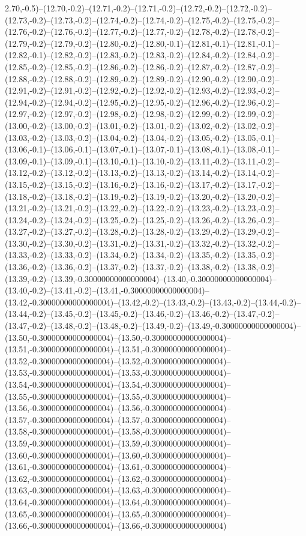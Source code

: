 2.70,-0.5)--(12.70,-0.2)--(12.71,-0.2)--(12.71,-0.2)--(12.72,-0.2)--(12.72,-0.2)--(12.73,-0.2)--(12.73,-0.2)--(12.74,-0.2)--(12.74,-0.2)--(12.75,-0.2)--(12.75,-0.2)--(12.76,-0.2)--(12.76,-0.2)--(12.77,-0.2)--(12.77,-0.2)--(12.78,-0.2)--(12.78,-0.2)--(12.79,-0.2)--(12.79,-0.2)--(12.80,-0.2)--(12.80,-0.1)--(12.81,-0.1)--(12.81,-0.1)--(12.82,-0.1)--(12.82,-0.2)--(12.83,-0.2)--(12.83,-0.2)--(12.84,-0.2)--(12.84,-0.2)--(12.85,-0.2)--(12.85,-0.2)--(12.86,-0.2)--(12.86,-0.2)--(12.87,-0.2)--(12.87,-0.2)--(12.88,-0.2)--(12.88,-0.2)--(12.89,-0.2)--(12.89,-0.2)--(12.90,-0.2)--(12.90,-0.2)--(12.91,-0.2)--(12.91,-0.2)--(12.92,-0.2)--(12.92,-0.2)--(12.93,-0.2)--(12.93,-0.2)--(12.94,-0.2)--(12.94,-0.2)--(12.95,-0.2)--(12.95,-0.2)--(12.96,-0.2)--(12.96,-0.2)--(12.97,-0.2)--(12.97,-0.2)--(12.98,-0.2)--(12.98,-0.2)--(12.99,-0.2)--(12.99,-0.2)--(13.00,-0.2)--(13.00,-0.2)--(13.01,-0.2)--(13.01,-0.2)--(13.02,-0.2)--(13.02,-0.2)--(13.03,-0.2)--(13.03,-0.2)--(13.04,-0.2)--(13.04,-0.2)--(13.05,-0.2)--(13.05,-0.1)--(13.06,-0.1)--(13.06,-0.1)--(13.07,-0.1)--(13.07,-0.1)--(13.08,-0.1)--(13.08,-0.1)--(13.09,-0.1)--(13.09,-0.1)--(13.10,-0.1)--(13.10,-0.2)--(13.11,-0.2)--(13.11,-0.2)--(13.12,-0.2)--(13.12,-0.2)--(13.13,-0.2)--(13.13,-0.2)--(13.14,-0.2)--(13.14,-0.2)--(13.15,-0.2)--(13.15,-0.2)--(13.16,-0.2)--(13.16,-0.2)--(13.17,-0.2)--(13.17,-0.2)--(13.18,-0.2)--(13.18,-0.2)--(13.19,-0.2)--(13.19,-0.2)--(13.20,-0.2)--(13.20,-0.2)--(13.21,-0.2)--(13.21,-0.2)--(13.22,-0.2)--(13.22,-0.2)--(13.23,-0.2)--(13.23,-0.2)--(13.24,-0.2)--(13.24,-0.2)--(13.25,-0.2)--(13.25,-0.2)--(13.26,-0.2)--(13.26,-0.2)--(13.27,-0.2)--(13.27,-0.2)--(13.28,-0.2)--(13.28,-0.2)--(13.29,-0.2)--(13.29,-0.2)--(13.30,-0.2)--(13.30,-0.2)--(13.31,-0.2)--(13.31,-0.2)--(13.32,-0.2)--(13.32,-0.2)--(13.33,-0.2)--(13.33,-0.2)--(13.34,-0.2)--(13.34,-0.2)--(13.35,-0.2)--(13.35,-0.2)--(13.36,-0.2)--(13.36,-0.2)--(13.37,-0.2)--(13.37,-0.2)--(13.38,-0.2)--(13.38,-0.2)--(13.39,-0.2)--(13.39,-0.30000000000000004)--(13.40,-0.30000000000000004)--(13.40,-0.2)--(13.41,-0.2)--(13.41,-0.30000000000000004)--(13.42,-0.30000000000000004)--(13.42,-0.2)--(13.43,-0.2)--(13.43,-0.2)--(13.44,-0.2)--(13.44,-0.2)--(13.45,-0.2)--(13.45,-0.2)--(13.46,-0.2)--(13.46,-0.2)--(13.47,-0.2)--(13.47,-0.2)--(13.48,-0.2)--(13.48,-0.2)--(13.49,-0.2)--(13.49,-0.30000000000000004)--(13.50,-0.30000000000000004)--(13.50,-0.30000000000000004)--(13.51,-0.30000000000000004)--(13.51,-0.30000000000000004)--(13.52,-0.30000000000000004)--(13.52,-0.30000000000000004)--(13.53,-0.30000000000000004)--(13.53,-0.30000000000000004)--(13.54,-0.30000000000000004)--(13.54,-0.30000000000000004)--(13.55,-0.30000000000000004)--(13.55,-0.30000000000000004)--(13.56,-0.30000000000000004)--(13.56,-0.30000000000000004)--(13.57,-0.30000000000000004)--(13.57,-0.30000000000000004)--(13.58,-0.30000000000000004)--(13.58,-0.30000000000000004)--(13.59,-0.30000000000000004)--(13.59,-0.30000000000000004)--(13.60,-0.30000000000000004)--(13.60,-0.30000000000000004)--(13.61,-0.30000000000000004)--(13.61,-0.30000000000000004)--(13.62,-0.30000000000000004)--(13.62,-0.30000000000000004)--(13.63,-0.30000000000000004)--(13.63,-0.30000000000000004)--(13.64,-0.30000000000000004)--(13.64,-0.30000000000000004)--(13.65,-0.30000000000000004)--(13.65,-0.30000000000000004)--(13.66,-0.30000000000000004)--(13.66,-0.30000000000000004)